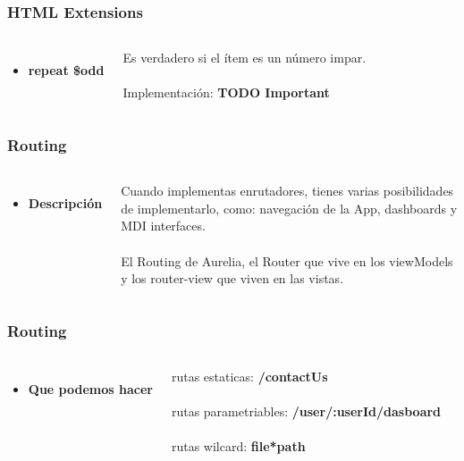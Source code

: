 \documentclass{beamer}
\begin{document}
\begin{frame}
\frametitle{HTML Extensions}
\begin{columns}[c]
\begin{itemize}
\item \textbf{repeat \$odd}
\end{itemize}
Es verdadero si el \'item es un n\'umero impar.
\\~\\
Implementaci\'on: \textbf{TODO Important}
\end{columns}
\end{frame}
\begin{frame}
\frametitle{Routing}
\begin{columns}[c]
\begin{itemize}
\item \textbf{Descripci\'on}
\end{itemize}
Cuando implementas enrutadores, tienes varias posibilidades de implementarlo, como: navegaci\'on de la App, dashboards y MDI interfaces.
\\~\\
El Routing de Aurelia, el Router que vive en los viewModels y los router-view que viven en las vistas.
\end{columns}
\end{frame}
\begin{frame}
\frametitle{Routing}
\begin{columns}[c]
\begin{itemize}
\item \textbf{Que podemos hacer}
\end{itemize}
rutas estaticas: \textbf{/contactUs}
\\~\\
rutas parametriables: \textbf{/user/:userId/dasboard}
\\~\\
rutas wilcard: \textbf{file*path}
\end{columns}
\end{frame}
\end{document}
